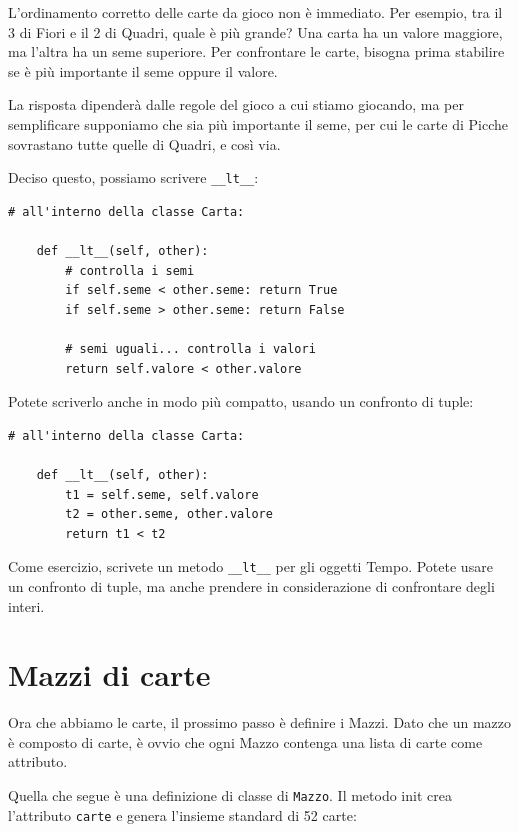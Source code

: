 \documentclass[10pt]{book}
\begin{document}
L'ordinamento corretto delle carte da gioco non è immediato. Per esempio, tra il 3 di Fiori e il 2 di Quadri, quale è più grande? Una carta ha un valore maggiore, ma l'altra ha un seme superiore. Per confrontare le carte, bisogna prima stabilire se è più importante il seme oppure il valore.

La risposta dipenderà dalle regole del gioco a cui stiamo giocando, ma per semplificare supponiamo che sia più importante il seme, per cui le carte di Picche sovrastano tutte quelle di Quadri, e così via.

Deciso questo, possiamo scrivere \verb"__lt__":

\begin{verbatim}
# all'interno della classe Carta:

    def __lt__(self, other):
        # controlla i semi
        if self.seme < other.seme: return True
        if self.seme > other.seme: return False

        # semi uguali... controlla i valori
        return self.valore < other.valore

\end{verbatim}
%
Potete scriverlo anche in modo più compatto, usando un confronto di tuple:

\begin{verbatim}
# all'interno della classe Carta:

    def __lt__(self, other):
        t1 = self.seme, self.valore
        t2 = other.seme, other.valore
        return t1 < t2
\end{verbatim}
%

Come esercizio, scrivete un metodo \verb"__lt__" per gli oggetti Tempo. Potete usare un confronto di tuple, ma anche prendere in considerazione di confrontare degli interi.


\section{Mazzi di carte}

Ora che abbiamo le carte, il prossimo passo è definire i Mazzi. Dato che un mazzo è composto di carte, è ovvio che ogni Mazzo contenga una lista di carte come attributo.

Quella che segue è una definizione di classe di {\tt Mazzo}.  Il metodo init crea l'attributo {\tt carte} e genera l'insieme standard di 52 carte:
\end{document}
